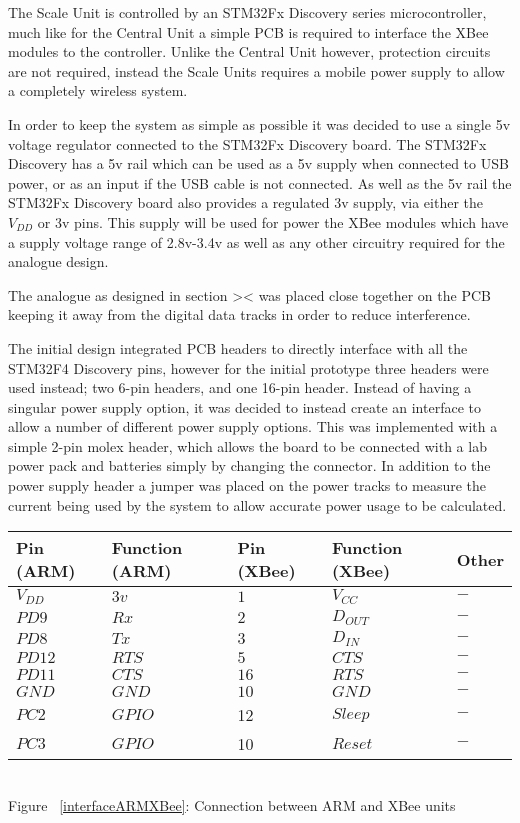The Scale Unit is controlled by an STM32Fx Discovery series microcontroller, much like for the Central Unit a simple PCB is required to interface the XBee modules to the controller.  Unlike the Central Unit however, protection circuits are not required, instead the Scale Units requires a mobile power supply to allow a completely wireless system.

In order to keep the system as simple as possible it was decided to use a single 5v voltage regulator connected to the STM32Fx Discovery board. The STM32Fx Discovery has a 5v rail which can be used as a 5v supply when connected to USB power, or as an input if the USB cable is not connected. As well as the 5v rail the STM32Fx Discovery board also provides a regulated 3v supply, via either the $V_{DD}$ or 3v pins. This supply will be used for power the XBee modules which have a supply voltage range of 2.8v-3.4v as well as any other circuitry required for the analogue design.

The analogue as designed in section >< was placed close together on the PCB keeping it away from the digital data tracks in order to reduce interference.

The initial design integrated PCB headers to directly interface with all the STM32F4 Discovery pins, however for the initial prototype three headers were used instead; two 6-pin headers, and one 16-pin header. Instead of having a singular power supply option, it was decided to instead create an interface to allow a number of different power supply options. This was implemented with a simple 2-pin molex header, which allows the board to be connected with a lab power pack and batteries simply by changing the connector. In addition to the power supply header a jumper was placed on the power tracks to measure the current being used by the system to allow accurate power usage to be calculated.

\begin{center}
  \begin{tabular}{| l | l | l | l | l |}
    \hline
    \bf{Pin (ARM)} & \bf{Function (ARM)} & \bf{Pin (XBee)} & \bf{Function (XBee)}  & \bf{Other}\\ \hline
         $V_{DD}$ & $3v $& $1 $& $V_{CC} $& $ - $\\ \hline
	 $PD9$ & \(Rx\) &$ 2$ &$ D_{OUT}$ &$ - $\\ \hline
	 $PD8 $& \(Tx\) &$ 3$ &$ D_{IN}$ & $- $\\ \hline
	 $PD12$ & \(RTS\) & $5$ & $CTS$ &$ - $ \\ \hline
	 $PD11$ & $CTS$ & $16$ & $RTS$ & $-$ \\ \hline
	 $GND$ & \(GND\) & $10$ & \(GND\) & $-$\\ \hline
	$PC2 $ & \(GPIO\) & 12 & \(Sleep\) & $-$\\ \hline
	$PC3 $ & \(GPIO\) & 10 & \(Reset\) & $-$ \\
    \hline
  \end{tabular}
\label{interfaceARMXBee}\\
Figure ~\ref{interfaceARMXBee}: Connection between ARM and XBee units
\end{center}